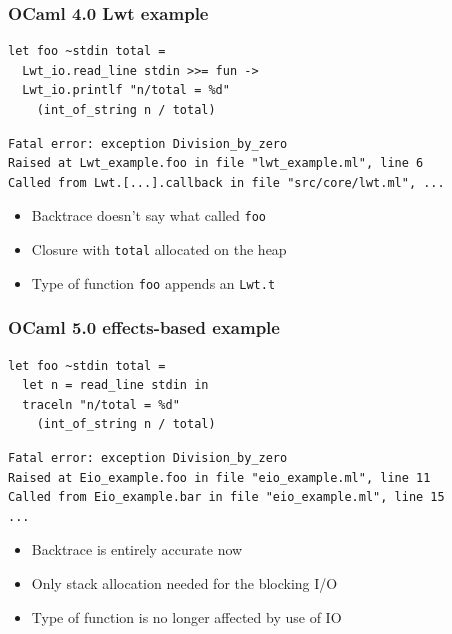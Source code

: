 \documentclass{beamer}
\begin{document}
\begin{frame}[fragile]
	\frametitle{OCaml 4.0 Lwt example}
\begin{lstlisting}[style=ocaml]
let foo ~stdin total =
  Lwt_io.read_line stdin >>= fun ->
  Lwt_io.printlf "n/total = %d"
    (int_of_string n / total)
\end{lstlisting}
\begin{lstlisting}[style=output]
Fatal error: exception Division_by_zero
Raised at Lwt_example.foo in file "lwt_example.ml", line 6
Called from Lwt.[...].callback in file "src/core/lwt.ml", ...
\end{lstlisting}
	\begin{itemize}
		\item Backtrace doesn't say what called \verb|foo|
		\item Closure with \verb|total| allocated on the heap
		\item Type of function \verb|foo| appends an \verb|Lwt.t|
	\end{itemize}
\end{frame}

\begin{frame}[fragile]
	\frametitle{OCaml 5.0 effects-based example}
\begin{lstlisting}[style=ocaml]
let foo ~stdin total =
  let n = read_line stdin in
  traceln "n/total = %d"
    (int_of_string n / total)
\end{lstlisting}
\begin{lstlisting}[style=output]
Fatal error: exception Division_by_zero
Raised at Eio_example.foo in file "eio_example.ml", line 11
Called from Eio_example.bar in file "eio_example.ml", line 15
...
\end{lstlisting}
\begin{itemize}
  \item Backtrace is entirely accurate now
  \item Only stack allocation needed for the blocking I/O
  \item Type of function is no longer affected by use of IO
\end{itemize}

\end{frame}
\end{document}
